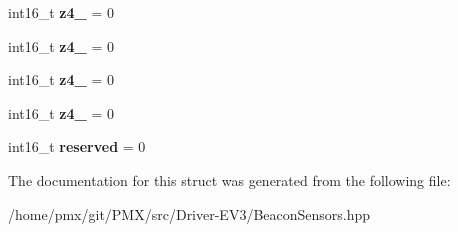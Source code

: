 \begin{DoxyCompactItemize}
\item 
\mbox{\label{structRegisters_a6994dfc6410bc0147582ebe1332db9fc}} 
int16\+\_\+t {\bfseries z4\+\_} = 0
\item 
\mbox{\label{structRegisters_aa6a49df66c47698fc851d9e724150d35}} 
int16\+\_\+t {\bfseries z4\+\_} = 0
\item 
\mbox{\label{structRegisters_ace35602d3db71f83fcaf0eb87c230bf9}} 
int16\+\_\+t {\bfseries z4\+\_} = 0
\item 
\mbox{\label{structRegisters_afb6c940b203fe92d29a71d5c85896bfa}} 
int16\+\_\+t {\bfseries z4\+\_} = 0
\item 
\mbox{\label{structRegisters_ac7e767364de593b273d7a8b5c62aad12}} 
int16\+\_\+t {\bfseries reserved} = 0
\end{DoxyCompactItemize}


The documentation for this struct was generated from the following file\+:\begin{DoxyCompactItemize}
\item 
/home/pmx/git/\+P\+M\+X/src/\+Driver-\/\+E\+V3/Beacon\+Sensors.\+hpp\end{DoxyCompactItemize}
